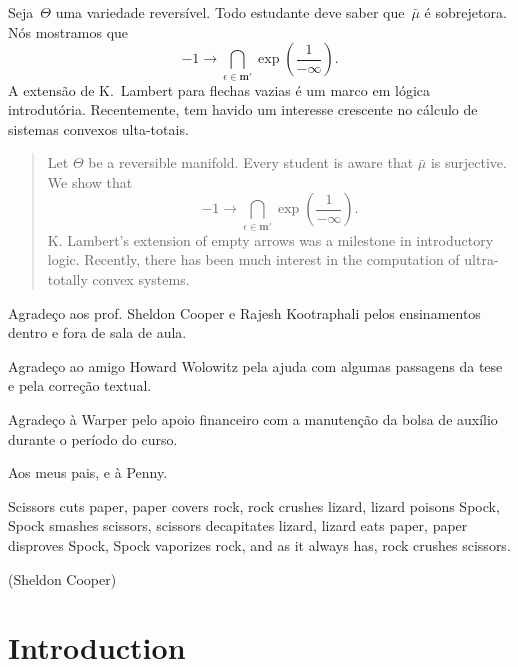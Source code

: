 \documentclass[rascunho]{ufc}
\theoremstyle{plain}
\theoremstyle{definition}
\begin{document}
\maketitle
\begin{resumo}
Seja~$\Theta$ uma variedade reversível. Todo estudante deve saber que~$\bar{\mu}$ é sobrejetora. Nós mostramos que $$-1 \to \bigcap_{\epsilon \in \mathbf{{m}}'}  \exp \left( \frac{1}{-\infty} \right).$$  A extensão de K.~Lambert para flechas vazias é um marco em lógica introdutória. Recentemente, tem havido um interesse crescente no cálculo de sistemas convexos ulta-totais.
\end{resumo}

\begin{abstract}
 Let $\Theta$ be a reversible manifold.  Every student is aware that $\bar{\mu}$ is surjective.  We show that $$-1 \to \bigcap_{\epsilon \in \mathbf{{m}}'}  \exp \left( \frac{1}{-\infty} \right).$$  K. Lambert's extension of empty arrows was a milestone in introductory logic. Recently, there has been much interest in the computation of ultra-totally convex systems.
\end{abstract}

\begin{agradecimentos}
Agradeço aos prof. Sheldon Cooper e Rajesh Kootraphali pelos ensinamentos dentro e fora de sala de aula.

Agradeço ao amigo Howard Wolowitz pela ajuda com algumas passagens da tese e pela correção textual.

Agradeço à Warper pelo apoio financeiro com a manutenção da bolsa de auxílio durante o período do curso.
\end{agradecimentos}

\begin{dedicatoria}
Aos meus pais, e à Penny.
\end{dedicatoria}

\begin{epigrafe}
Scissors cuts paper, paper covers rock, rock crushes lizard, lizard poisons Spock, Spock smashes scissors, scissors decapitates lizard, lizard eats paper, paper disproves Spock, Spock vaporizes rock, and as it always has, rock crushes scissors.\par\textnormal{(Sheldon Cooper)}
\end{epigrafe}

\tableofcontents

\chapter{Introduction}
\end{document}
